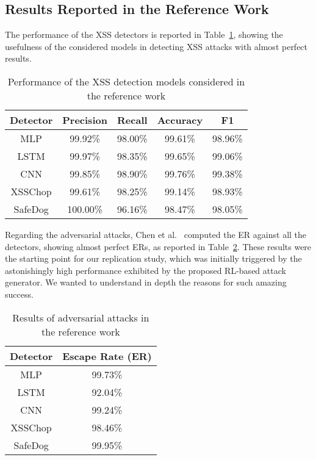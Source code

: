 \subsection{Results Reported in the Reference Work}

The performance of the  XSS detectors is reported in Table~\ref{tab:detectors_reference}, showing the usefulness of the considered models in detecting XSS attacks with almost perfect results.

\begin{table}[!h]
\caption{Performance of the XSS detection models considered in the reference work}
\label{tab:detectors_reference}
\centering
\scalebox {1.0} {
\begin{tabular}{c|cccc}
    \toprule
    Detector & Precision & Recall  & Accuracy & F1      \\
    \midrule
    MLP        & 99.92\%   & 98.00\% & 99.61\%  & 98.96\% \\
    LSTM       & 99.97\%   & 98.35\% & 99.65\%  & 99.06\% \\
    CNN        & 99.85\%   & 98.90\% & 99.76\%  & 99.38\% \\
    XSSChop    & 99.61\%   & 98.25\% & 99.14\%  & 98.93\% \\
    SafeDog    & 100.00\%  & 96.16\% & 98.47\%  & 98.05\% \\ 
    
    \bottomrule
\end{tabular}
}

\end{table}


Regarding the adversarial attacks, Chen et al.~\cite{CHEN2022102831} computed the ER against all the detectors, showing almost perfect ERs, as reported in Table~\ref{tab:adversarial_reference}. These results were the starting point for our replication study, which was initially triggered by the astonishingly high performance exhibited by the proposed RL-based attack generator. We wanted to understand in depth the reasons for such amazing success.

\begin{table}[!h]
\caption{Results of  adversarial attacks in the reference work}
\label{tab:adversarial_reference}
\centering
\scalebox {1.0} {
\begin{tabular}{c|c}
    \toprule
    Detector & Escape Rate (ER) \\
    \midrule
    MLP             & 99.73\%     \\
    LSTM            & 92.04\%     \\
    CNN             & 99.24\%     \\
    XSSChop         & 98.46\%     \\
    SafeDog         & 99.95\%     \\ 
    \bottomrule
\end{tabular}
}
\end{table}




